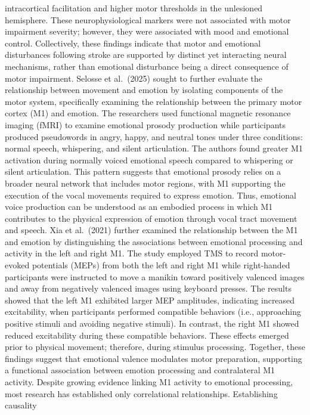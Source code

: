 \documentclass[
]{article}
\begin{document}
intracortical facilitation and higher motor thresholds in the unlesioned
hemisphere. These neurophysiological markers were not associated with
motor impairment severity; however, they were associated with mood and
emotional control. Collectively, these findings indicate that motor and
emotional disturbances following stroke are supported by distinct yet
interacting neural mechanisms, rather than emotional disturbance being a
direct consequence of motor impairment. Selosse et al.~(2025) sought to
further evaluate the relationship between movement and emotion by
isolating components of the motor system, specifically examining the
relationship between the primary motor cortex (M1) and emotion. The
researchers used functional magnetic resonance imaging (fMRI) to examine
emotional prosody production while participants produced pseudowords in
angry, happy, and neutral tones under three conditions: normal speech,
whispering, and silent articulation. The authors found greater M1
activation during normally voiced emotional speech compared to
whispering or silent articulation. This pattern suggests that emotional
prosody relies on a broader neural network that includes motor regions,
with M1 supporting the execution of the vocal movements required to
express emotion. Thus, emotional voice production can be understood as
an embodied process in which M1 contributes to the physical expression
of emotion through vocal tract movement and speech. Xia et al.~(2021)
further examined the relationship between the M1 and emotion by
distinguishing the associations between emotional processing and
activity in the left and right M1. The study employed TMS to record
motor-evoked potentials (MEPs) from both the left and right M1 while
right-handed participants were instructed to move a manikin toward
positively valenced images and away from negatively valenced images
using keyboard presses. The results showed that the left M1 exhibited
larger MEP amplitudes, indicating increased excitability, when
participants performed compatible behaviors (i.e., approaching positive
stimuli and avoiding negative stimuli). In contrast, the right M1 showed
reduced excitability during these compatible behaviors. These effects
emerged prior to physical movement; therefore, during stimulus
processing. Together, these findings suggest that emotional valence
modulates motor preparation, supporting a functional association between
emotion processing and contralateral M1 activity. Despite growing
evidence linking M1 activity to emotional processing, most research has
established only correlational relationships. Establishing causality
\end{document}
